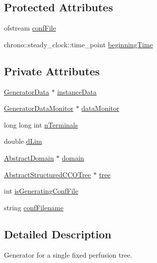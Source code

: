\subsection*{Protected Attributes}
\begin{DoxyCompactItemize}
\item 
ofstream \hyperlink{class_fixed_perfusion_radius_tree_generator_acccbb50a7aa221b58e80e47515650a5a}{conf\+File}
\item 
chrono\+::steady\+\_\+clock\+::time\+\_\+point \hyperlink{class_fixed_perfusion_radius_tree_generator_ab1945f73c7d8ac571c34b68792d5d317}{beginning\+Time}
\end{DoxyCompactItemize}
\subsection*{Private Attributes}
\begin{DoxyCompactItemize}
\item 
\hyperlink{class_generator_data}{Generator\+Data} $\ast$ \hyperlink{class_fixed_perfusion_radius_tree_generator_a00f2d253632c5188a13576d614586d02}{instance\+Data}
\item 
\hyperlink{class_generator_data_monitor}{Generator\+Data\+Monitor} $\ast$ \hyperlink{class_fixed_perfusion_radius_tree_generator_a431e0e44437bc9cbee263ab316c8ed60}{data\+Monitor}
\item 
long long int \hyperlink{class_fixed_perfusion_radius_tree_generator_a7f47f9518335cd88504f2575d75a6935}{n\+Terminals}
\item 
double \hyperlink{class_fixed_perfusion_radius_tree_generator_ae14a2fd89b3e87d51d8d304abab238be}{d\+Lim}
\item 
\hyperlink{class_abstract_domain}{Abstract\+Domain} $\ast$ \hyperlink{class_fixed_perfusion_radius_tree_generator_a3f613d457aa40ecbec9c61b0fd559764}{domain}
\item 
\hyperlink{class_abstract_structured_c_c_o_tree}{Abstract\+Structured\+C\+C\+O\+Tree} $\ast$ \hyperlink{class_fixed_perfusion_radius_tree_generator_a79a3059e0c4555a2008829d5a51803dd}{tree}
\item 
int \hyperlink{class_fixed_perfusion_radius_tree_generator_aa4e8b9db77041b6981d1747835faaafe}{is\+Generating\+Conf\+File}
\item 
string \hyperlink{class_fixed_perfusion_radius_tree_generator_a429c60ad818d28d0a50167beaecf60b9}{conf\+Filename}
\end{DoxyCompactItemize}


\subsection{Detailed Description}
Generator for a single fixed perfusion tree. 

